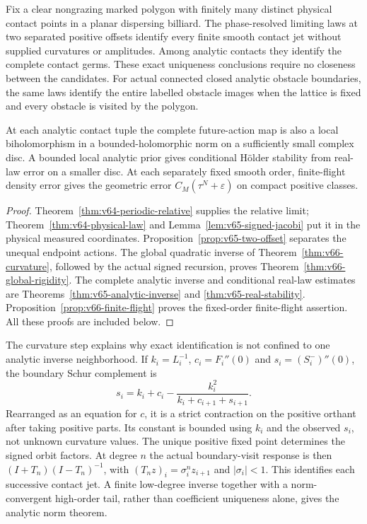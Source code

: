 \begin{theorem}
\label{thm:v66-main}
Fix a clear nongrazing marked polygon with finitely many distinct physical
contact points in a planar dispersing billiard.  The phase-resolved
limiting laws at two separated positive offsets identify every finite
smooth contact jet without supplied curvatures or amplitudes.  Among
analytic contacts they identify the complete contact germs.  These exact
uniqueness conclusions require no closeness between the candidates.
For actual connected closed analytic obstacle boundaries, the same laws
identify the entire labelled obstacle images when the lattice is fixed
and every obstacle is visited by the polygon.

At each analytic contact tuple the complete future-action map is also a
local biholomorphism in a bounded-holomorphic norm on a sufficiently small
complex disc.  A bounded local analytic prior gives conditional H\"older
stability from real-law error on a smaller disc.  At each separately fixed
smooth order, finite-flight density error gives the geometric error
$C_M(\tau^N+\varepsilon)$ on compact positive classes.
\end{theorem}
\begin{proof}
Theorem~\ref{thm:v64-periodic-relative} supplies the relative limit;
Theorem~\ref{thm:v64-physical-law} and
Lemma~\ref{lem:v65-signed-jacobi} put it in the physical measured
coordinates.  Proposition~\ref{prop:v65-two-offset} separates the
unequal endpoint actions.  The global quadratic inverse of
Theorem~\ref{thm:v66-curvature}, followed by the actual signed recursion,
proves Theorem~\ref{thm:v66-global-rigidity}.  The complete analytic
inverse and conditional real-law estimates are
Theorems~\ref{thm:v65-analytic-inverse} and
\ref{thm:v65-real-stability}.  Proposition~\ref{prop:v66-finite-flight}
proves the fixed-order finite-flight assertion.  All these proofs are
included below.
\end{proof}

The curvature step explains why exact identification is not confined to
one analytic inverse neighborhood.  If $k_i=L_i^{-1}$,
$c_i=F_i''(0)$ and $s_i=(S_i^-)''(0)$, the boundary Schur complement is
\[
 s_i=k_i+c_i-\frac{k_i^2}{k_i+c_{i+1}+s_{i+1}}.
\]
Rearranged as an equation for $c$, it is a strict contraction on the
positive orthant after taking positive parts.  Its constant is bounded
using $k_i$ and the observed $s_i$, not unknown curvature values.
The unique positive fixed point determines the signed orbit factors.
At degree $n$ the actual boundary-visit response is then
$(I+T_n)(I-T_n)^{-1}$, with
$(T_n z)_i=\sigma_i^n z_{i+1}$ and $|\sigma_i|<1$.
This identifies each successive contact jet.  A finite low-degree
inverse together with a norm-convergent high-order tail, rather than
coefficient uniqueness alone, gives the analytic norm theorem.

